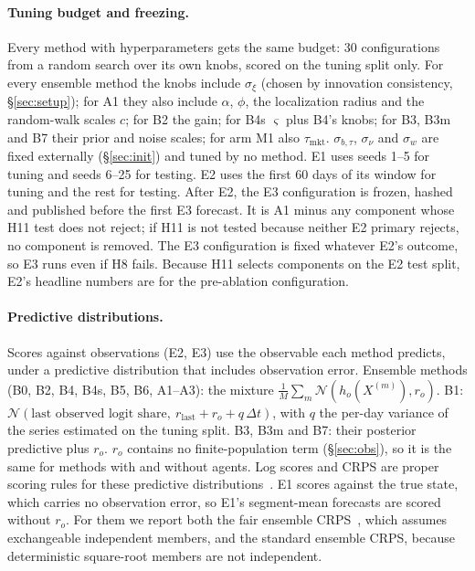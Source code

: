 \documentclass[10pt]{article}
\theoremstyle{remark}
\begin{document}
\paragraph{Tuning budget and freezing.} Every method with hyperparameters gets the same budget: 30 configurations from a random search over its own knobs, scored on the tuning split only. For every ensemble method the knobs include $\sigma_\xi$ (chosen by innovation consistency, \S\ref{sec:setup}); for A1 they also include $\alpha$, $\phi$, the localization radius and the random-walk scales $c$; for B2 the gain; for B4s $\varsigma$ plus B4's knobs; for B3, B3m and B7 their prior and noise scales; for arm M1 also $\tau_{\mathrm{mkt}}$. $\sigma_{b,\tau}$, $\sigma_\nu$ and $\sigma_w$ are fixed externally (\S\ref{sec:init}) and tuned by no method. E1 uses seeds 1--5 for tuning and seeds 6--25 for testing. E2 uses the first 60 days of its window for tuning and the rest for testing. After E2, the E3 configuration is frozen, hashed and published before the first E3 forecast. It is A1 minus any component whose H11 test does not reject; if H11 is not tested because neither E2 primary rejects, no component is removed. The E3 configuration is fixed whatever E2's outcome, so E3 runs even if H8 fails. Because H11 selects components on the E2 test split, E2's headline numbers are for the pre-ablation configuration.

\paragraph{Predictive distributions.} Scores against observations (E2, E3) use the observable each method predicts, under a predictive distribution that includes observation error. Ensemble methods (B0, B2, B4, B4s, B5, B6, A1--A3): the mixture $\frac1M\sum_m\mathcal{N}(h_o(X^{(m)}),r_o)$. B1: $\mathcal{N}(\text{last observed logit share},\ r_{\mathrm{last}}+r_o+q\,\Delta t)$, with $q$ the per-day variance of the series estimated on the tuning split. B3, B3m and B7: their posterior predictive plus $r_o$. $r_o$ contains no finite-population term (\S\ref{sec:obs}), so it is the same for methods with and without agents. Log scores and CRPS are proper scoring rules for these predictive distributions~\cite{gneiting2007}. E1 scores against the true state, which carries no observation error, so E1's segment-mean forecasts are scored without $r_o$. For them we report both the fair ensemble CRPS~\cite{ferro2014}, which assumes exchangeable independent members, and the standard ensemble CRPS, because deterministic square-root members are not independent.
\end{document}
